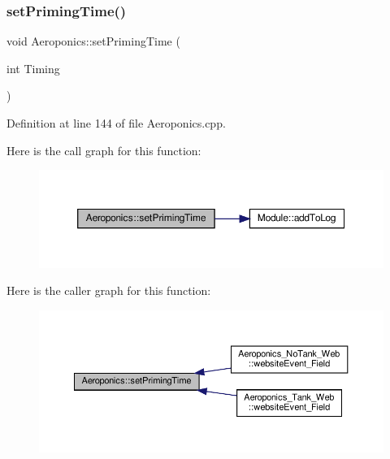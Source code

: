 \mbox{\label{class_aeroponics_ad9568506941f5de8d849eae4daca1bd7}} 
\subsubsection{\texorpdfstring{set\+Priming\+Time()}{setPrimingTime()}\hspace{0.1cm}{\footnotesize\ttfamily [1/2]}}
{\footnotesize\ttfamily void Aeroponics\+::set\+Priming\+Time (\begin{DoxyParamCaption}\item[{int}]{Timing }\end{DoxyParamCaption})\hspace{0.3cm}{\ttfamily [protected]}}



Definition at line 144 of file Aeroponics.\+cpp.

Here is the call graph for this function\+:
\nopagebreak
\begin{figure}[H]
\begin{center}
\leavevmode
\includegraphics[width=350pt]{class_aeroponics_ad9568506941f5de8d849eae4daca1bd7_cgraph}
\end{center}
\end{figure}
Here is the caller graph for this function\+:
\nopagebreak
\begin{figure}[H]
\begin{center}
\leavevmode
\includegraphics[width=350pt]{class_aeroponics_ad9568506941f5de8d849eae4daca1bd7_icgraph}
\end{center}
\end{figure}
\mbox{\label{class_aeroponics_ad9568506941f5de8d849eae4daca1bd7}} 
